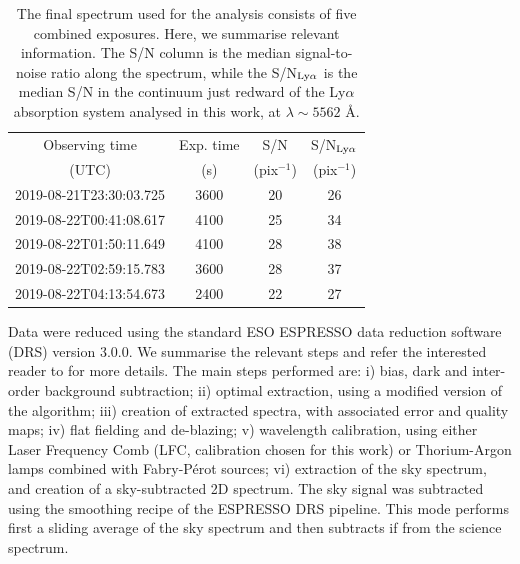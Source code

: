 \documentclass[fleqn,usenatbib]{mnras}
\begin{document}
\begin{table}
    \centering
    \begin{tabular}{cccc}
    \toprule
    Observing time & Exp. time & S/N & S/N$_{{\rm Ly}\alpha}$ \\
    (UTC) & (s) & (pix$^{-1}$) & (pix$^{-1}$) \\
    \midrule
    2019-08-21T23:30:03.725 & 3600 & 20 & 26 \\
    2019-08-22T00:41:08.617 & 4100 & 25 & 34 \\
    2019-08-22T01:50:11.649 & 4100 & 28 & 38 \\
    2019-08-22T02:59:15.783 & 3600 & 28 & 37 \\
    2019-08-22T04:13:54.673 & 2400 & 22 & 27 \\
    \bottomrule
    \end{tabular}
    \caption{The final spectrum used for the analysis consists of five combined exposures. Here, we summarise relevant information. The S/N column is the median signal-to-noise ratio along the spectrum, while the S/N$_{{\rm Ly}\alpha}$ is the median S/N in the continuum just redward of the Ly$\alpha$ absorption system analysed in this work, at $\lambda \sim 5562$ \AA.}
    \label{tab:obsSummary}
\end{table}



Data were reduced using the standard ESO ESPRESSO data reduction software (DRS) version 3.0.0. We summarise the relevant steps and refer the interested reader to \citet{ESPRESSO} for more details. The main steps performed are: i) bias, dark and inter-order background subtraction; ii) optimal extraction, using a modified version of the \citet{Zechmeister_optimalExtraction} algorithm; iii) creation of extracted spectra, with associated error and quality maps; iv) flat fielding and de-blazing; v) wavelength calibration, using either Laser Frequency Comb (LFC, calibration chosen for this work) or Thorium-Argon lamps combined with Fabry-P\'erot sources; vi) extraction of the sky spectrum, and creation of a sky-subtracted 2D spectrum. The sky signal was subtracted using the smoothing recipe of the ESPRESSO DRS pipeline. This mode performs first a sliding average of the sky spectrum and then subtracts if from the science spectrum.
\end{document}
